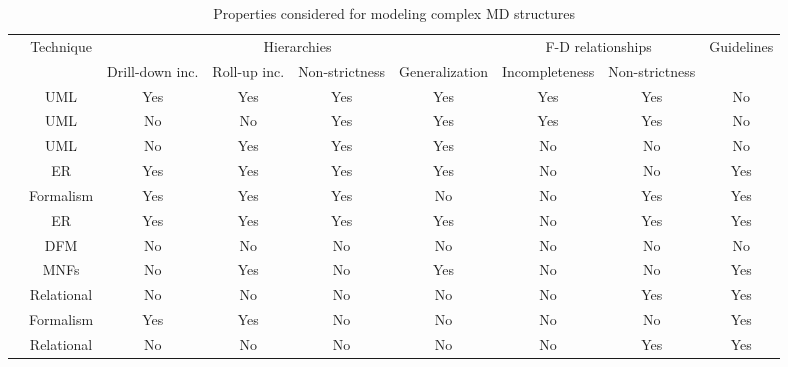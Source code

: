 \begin{table}
    \tiny
    \centering
        \caption{Properties considered for modeling complex MD structures}
    \label{a1:tab:related1}
        \begin{tabular}{|c|c|c|c|c|c|c|c|c|}
        \hline
        & Technique & \multicolumn{4}{|c|}{Hierarchies} & \multicolumn{2}{|c|}{F-D relationships} & Guidelines \\
        \cline{3-8}
        & & Drill-down inc. & Roll-up inc. & Non-strictness & Generalization & Incompleteness & Non-strictness & \\
        \hline
        \hline
        \cite{DBLP:journals/dke/Lujan-MoraTS06} & UML & Yes & Yes & Yes & Yes & Yes & Yes & No \\
        \cite{DBLP:journals/is/AbelloSS06} & UML & No & No & Yes & Yes & Yes& Yes & No \\
        \cite{DBLP:conf/er/AkokaCP01,DBLP:journals/dss/PratAC06} & UML & No & Yes & Yes & Yes & No & No & No \\
        \cite{DBLP:conf/caise/MalinowskiZ04,DBLP:journals/dke/MalinowskiZ06} & ER & Yes & Yes & Yes & Yes & No & No & Yes \\
        \cite{DBLP:conf/vldb/PedersenJD99,DBLP:journals/is/PedersenJD01} & Formalism & Yes & Yes & Yes & No & No & Yes & Yes \\
        \cite{DBLP:conf/dawak/MansmannS06,MansmannIJDWDM07} & ER & Yes & Yes & Yes & Yes & No & Yes & Yes \\
        \cite{DBLP:journals/ijcis/GolfarelliMR98} & DFM & No & No & No & No & No & No & No \\
        \cite{DBLP:conf/dmdw/HusemannLV00,DBLP:journals/is/LechtenborgerV03} & MNFs & No & Yes & No & Yes & No & No & Yes \\
        \cite{book/Kimball/DW} & Relational & No & No & No & No & No & Yes & Yes \\
        \cite{DBLP:journals/tods/HurtadoGM05} & Formalism & Yes & Yes & No & No & No & No & Yes \\
        \cite{DBLP:conf/dmdw/SongRME01} & Relational & No & No & No & No & No & Yes & Yes \\
        \hline
        \end{tabular}
\end{table}


